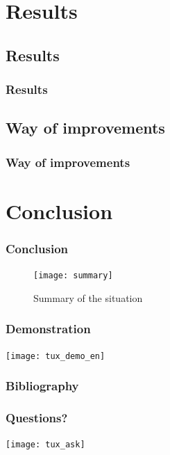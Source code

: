 \documentclass[10pt, svgnames, compress, red]{beamer}
\newcounter{th}[section]
\begin{document}
\section{Results}

\subsection{Results}
\begin{frame}
  \frametitle{Results}

\transdissolve[duration=0.1]
\end{frame}

\subsection{Way of improvements}
\begin{frame}
  \frametitle{Way of improvements}

\transdissolve[duration=0.1]
\end{frame}

\section{Conclusion}
\begin{frame}
  \frametitle{Conclusion}
  \begin{figure}[h]
    \centering
    \texttt{[image: summary]}
    \caption{Summary of the situation}
  \end{figure}
  \transdissolve[duration=0.1]
\end{frame}

\begin{frame}[allowframebreaks]
  \frametitle{Demonstration}
  \texttt{[image: tux\_demo\_en]}
  \transdissolve[duration=0.1]
\end{frame}

\begin{frame}[allowframebreaks]
  \frametitle{Bibliography}
  \nocite{*}
  
  \transdissolve[duration=0.1]
\end{frame}


\begin{frame}
  \frametitle{Questions?}

  \begin{center}
    \texttt{[image: tux\_ask]}
  \end{center}
  \transdissolve[duration=0.1]
\end{frame}
\end{document}
